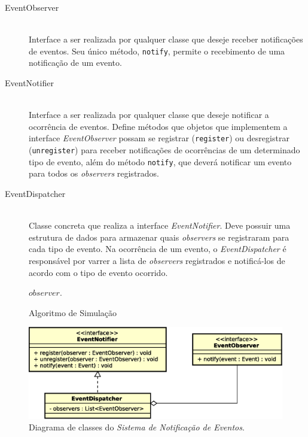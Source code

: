 \begin{description}
  \item[EventObserver] \hfill \\
    Interface a ser realizada por qualquer classe que deseje receber
    notificações de eventos. Seu único método, \texttt{notify}, permite o
    recebimento de uma notificação de um evento.

  \item[EventNotifier] \hfill \\
    Interface a ser realizada por qualquer classe que deseje notificar a
    ocorrência de eventos. Define métodos que objetos que implementem a
    interface \textit{EventObserver} possam se registrar (\texttt{register}) ou
    desregistrar (\texttt{unregister}) para receber notificações de ocorrências
    de um determinado tipo de evento, além do método \texttt{notify}, que deverá
    notificar um evento para todos os \textit{observers} registrados.

\item[EventDispatcher] \hfill \\
    Classe concreta que realiza a interface \textit{EventNotifier}. Deve possuir
    uma estrutura de dados para armazenar quais \textit{observers} se
    registraram para cada tipo de evento. Na ocorrência de um evento, o
    \textit{EventDispatcher} é responsável por varrer a lista de
    \textit{observers} registrados e notificá-los de acordo com o tipo de evento
    ocorrido.

    \begin{algorithm}[H]
    \begin{center}
    \begin{algorithmic}[1]
        \State $observer.$
      \EndFor
    \EndFunction
    \end{algorithmic}
    \end{center}
    \caption
       {\label{alg:notify}Algoritmo de Simulação}
    \end{algorithm}

\end{description}

\begin{figure}[htb!]
  \centering
  \includegraphics[scale=0.6]{img/Notification.eps}
  \caption{Diagrama de classes do \textit{Sistema de Notificação de Eventos}.}
\label{fig:diagram:notification}
\end{figure}

